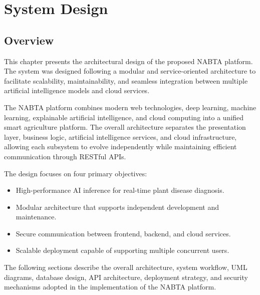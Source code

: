 
\chapter{System Design}
\label{chap:design}


\section{Overview}
\label{sec:design_overview}

This chapter presents the architectural design of the proposed NABTA platform. The system was designed following a modular and service-oriented architecture to facilitate scalability, maintainability, and seamless integration between multiple artificial intelligence models and cloud services.

The NABTA platform combines modern web technologies, deep learning, machine learning, explainable artificial intelligence, and cloud computing into a unified smart agriculture platform. The overall architecture separates the presentation layer, business logic, artificial intelligence services, and cloud infrastructure, allowing each subsystem to evolve independently while maintaining efficient communication through RESTful APIs.

The design focuses on four primary objectives:

\begin{itemize}
\item High-performance AI inference for real-time plant disease diagnosis.
\item Modular architecture that supports independent development and maintenance.
\item Secure communication between frontend, backend, and cloud services.
\item Scalable deployment capable of supporting multiple concurrent users.
\end{itemize}

The following sections describe the overall architecture, system workflow, UML diagrams, database design, API architecture, deployment strategy, and security mechanisms adopted in the implementation of the NABTA platform.

